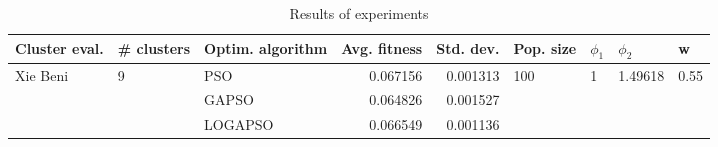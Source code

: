 \documentclass{article}
\begin{document}
\begin{table}
\centering
\caption{Results of experiments}
\begin{tabular}{lllrrllll}
\toprule
            Cluster eval. &        \# clusters & Optim. algorithm &  Avg. fitness &  Std. dev. &            Pop. size &         $\phi_{1}$ &               $\phi_{2}$ &                     w \\
\midrule
\multirow{3}{*}{Xie Beni} & \multirow{3}{*}{9} &              PSO &      0.067156 &   0.001313 & \multirow{3}{*}{100} & \multirow{3}{*}{1} & \multirow{3}{*}{1.49618} & \multirow{3}{*}{0.55} \\
                          &                    &            GAPSO &      0.064826 &   0.001527 &                      &                    &                          &                       \\
                          &                    &          LOGAPSO &      0.066549 &   0.001136 &                      &                    &                          &                       \\
\bottomrule
\end{tabular}
\end{table}
\end{document}
